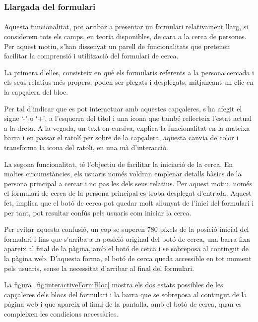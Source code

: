 \subsubsection{Llargada del formulari}

\paragraph{}
Aquesta funcionalitat, pot arribar a presentar un formulari relativament llarg, si considerem tots els camps, en teoria disponibles, de cara a la cerca de persones. Per aquest motiu, s'han dissenyat un parell de funcionalitats que pretenen facilitar la comprensió i utilització del formulari de cerca.

La primera d'elles, consisteix en què els formularis referents a la persona cercada i els seus relatius més propers, poden ser plegats i desplegats, mitjançant un clic en la capçalera del bloc.

Per tal d'indicar que es pot interactuar amb aquestes capçaleres, s'ha afegit el signe `-' o `+', a l'esquerra del títol i una icona que també reflecteix l'estat actual a la dreta. A la vegada, un text en cursiva, explica la funcionalitat en la mateixa barra i en passar el ratolí per sobre de la capçalera, aquesta canvia de color i transforma la icona del ratolí, en una mà d'interacció.

La segona funcionalitat, té l'objectiu de facilitar la iniciació de la cerca. En moltes circumstàncies, els usuaris només voldran emplenar detalls bàsics de la persona principal a cercar i no pas les dels seus relatius. Per aquest motiu, només el formulari de cerca de la persona principal es troba desplegat d'entrada. Aquest fet, implica que el botó de cerca pot quedar molt allunyat de l'inici del formulari i per tant, pot resultar confús pels usuaris com iniciar la cerca.

Per evitar aquesta confusió, un cop se superen 780 píxels de la posició inicial del formulari i fins que s'arriba a la posició original del botó de cerca, una barra fixa apareix al final de la pàgina, amb el botó de cerca i se sobreposa al contingut de la pàgina web. D'aquesta forma, el botó de cerca queda accessible en tot moment pels usuaris, sense la necessitat d'arribar al final del formulari.

La figura~\ref{fig:interactiveFormBloc} mostra els dos estats possibles de les capçaleres dels blocs del for\-mu\-la\-ri i la barra que se sobreposa al contingut de la pàgina web i que apareix al final de la pantalla, amb el botó de cerca, quan es compleixen les condicions necessàries.

